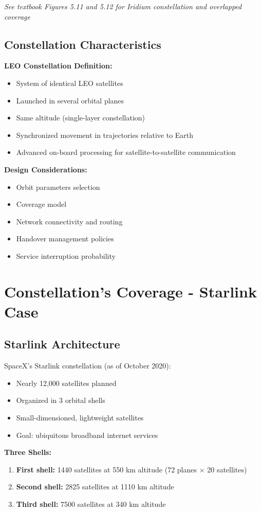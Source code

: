 \documentclass[11pt,letterpaper]{article}
\begin{document}
\textit{See textbook Figures 5.11 and 5.12 for Iridium constellation and overlapped coverage}

\subsection{Constellation Characteristics}
\textbf{LEO Constellation Definition:}
\begin{itemize}
    \item System of identical LEO satellites
    \item Launched in several orbital planes
    \item Same altitude (single-layer constellation)
    \item Synchronized movement in trajectories relative to Earth
    \item Advanced on-board processing for satellite-to-satellite communication
\end{itemize}

\textbf{Design Considerations:}
\begin{itemize}
    \item Orbit parameters selection
    \item Coverage model
    \item Network connectivity and routing
    \item Handover management policies
    \item Service interruption probability
\end{itemize}

\section{Constellation's Coverage - Starlink Case}

\subsection{Starlink Architecture}
SpaceX's Starlink constellation (as of October 2020):
\begin{itemize}
    \item Nearly 12,000 satellites planned
    \item Organized in 3 orbital shells
    \item Small-dimensioned, lightweight satellites
    \item Goal: ubiquitous broadband internet services
\end{itemize}

\textbf{Three Shells:}
\begin{enumerate}
    \item \textbf{First shell:} 1440 satellites at 550 km altitude (72 planes × 20 satellites)
    \item \textbf{Second shell:} 2825 satellites at 1110 km altitude
    \item \textbf{Third shell:} 7500 satellites at 340 km altitude
\end{enumerate}
\end{document}
